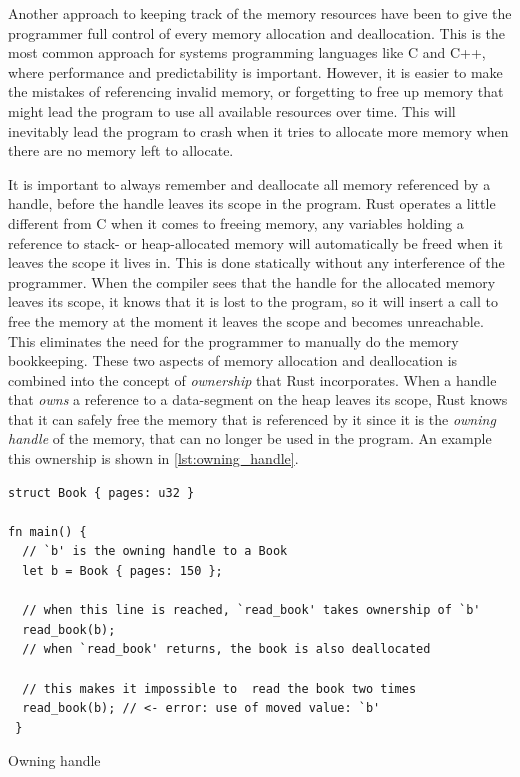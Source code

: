 Another approach to keeping track of the memory resources have been to give the programmer full control of every memory allocation and deallocation.
This is the most common approach for systems programming languages like C and C++, where performance and predictability is important.
However, it is easier to make the mistakes of referencing invalid memory, or forgetting to free up memory that might lead the program to use all available resources over time.
This will inevitably lead the program to crash when it tries to allocate more memory when there are no memory left to allocate.


It is important to always remember and deallocate all memory referenced by a handle, before the handle leaves its scope in the program.
Rust operates a little different from C when it comes to freeing memory, any variables holding a reference to stack- or heap-allocated memory will automatically be freed when it leaves the scope it lives in.
This is done statically without any interference of the programmer.
When the compiler sees that the handle for the allocated memory leaves its scope, it knows that it is lost to the program, so it will insert a call to free the memory at the moment it leaves the scope and becomes unreachable.
This eliminates the need for the programmer to manually do the memory bookkeeping.
These two aspects of memory allocation and deallocation is combined into the concept of \emph{ownership} that Rust incorporates.
When a handle that \emph{owns} a reference to a data-segment on the heap leaves its scope, Rust knows that it can safely free the memory that is referenced by it since it is the \emph{owning handle} of the memory, that can no longer be used in the program.
An example this ownership is shown in \autoref{lst:owning_handle}.

\begin{listing}[tb]
\begin{verbatim}
struct Book { pages: u32 }

fn main() {
  // `b' is the owning handle to a Book
  let b = Book { pages: 150 };

  // when this line is reached, `read_book' takes ownership of `b'
  read_book(b);
  // when `read_book' returns, the book is also deallocated

  // this makes it impossible to  read the book two times
  read_book(b); // <- error: use of moved value: `b'
 }
\end{verbatim}
\caption{Owning handle}
\label{lst:owning_handle}
\end{listing}

